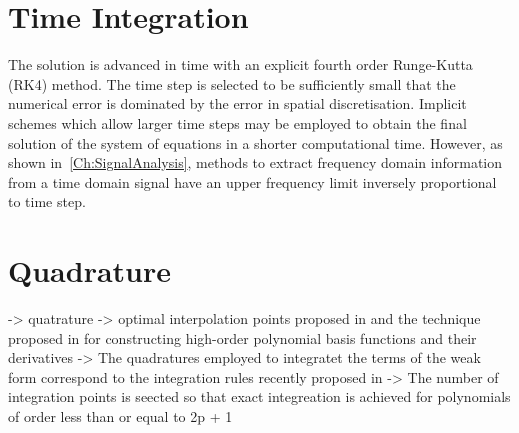 
\section{Time Integration}
The solution is advanced in time with an explicit fourth order Runge-Kutta (RK4)
method. The time step is selected to be sufficiently small that the numerical
error is dominated by the error in spatial discretisation. Implicit schemes which allow larger time steps may be employed to obtain the final solution of the system of equations in a shorter computational time. However, as shown in~\autoref{Ch:SignalAnalysis}, methods to extract frequency domain information from a time domain signal have an upper frequency limit inversely proportional to time step.



\section{Quadrature}

-> quatrature
  -> optimal interpolation points proposed in \cite{DGPaper:39} and the technique proposed in \cite{DGPaper:20} for constructing high-order polynomial basis functions and their derivatives
  -> The quadratures employed to integratet the terms of the weak form correspond to the integration rules recently proposed in \cite{DGPaper:40}
  -> The number of integration points is seected so that exact integreation is achieved for polynomials of order less than or equal to 2p + 1 


